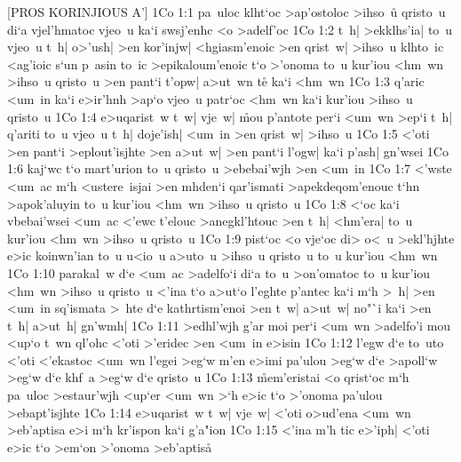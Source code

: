 [PROS KORINJIOUS A']
\vs 1Co 1:1
pa~uloc
klht`oc
>ap'ostoloc
>ihso~u\r{}
qristo~u
di`a
vjel'hmatoc
vjeo~u
ka`i
swsj'enhc
<o
>adelf'oc\bibvsend
\vs 1Co 1:2
t~h|
>ekklhs'ia|
to~u
vjeo~u
t~h|
o>'ush|
>en
kor'injw|
<hgiasm'enoic
>en
qrist~w|
>ihso~u
klhto~ic
<ag'ioic
s`un
p~asin
to~ic
>epikaloum'enoic
t`o
>'onoma
to~u
kur'iou
<hm~wn
>ihso~u
qristo~u
>en
pant`i
t'opw|
a>ut~wn
t\r{e}
ka`i
<hm~wn\bibvsend
\vs 1Co 1:3
q'aric
<um~in
ka`i
e>ir'hnh
>ap`o
vjeo~u
patr`oc
<hm~wn
ka`i
kur'iou
>ihso~u
qristo~u\bibvsend
\vs 1Co 1:4
e>uqarist~w
t~w|
vje~w|
\r{m}ou
p'antote
per`i
<um~wn
>ep`i
t~h|
q'ariti
to~u
vjeo~u
t~h|
doje'ish|
<um~in
>en
qrist~w|
>ihso~u\bibvsend
\vs 1Co 1:5
<'oti
>en
pant`i
>eplout'isjhte
>en
a>ut~w|
>en
pant`i
l'ogw|
ka`i
p'ash|
gn'wsei\bibvsend
\vs 1Co 1:6
kaj`wc
t`o
mart'urion
to~u
qristo~u
>ebebai'wjh
>en
<um~in\bibvsend
\vs 1Co 1:7
<'wste
<um~ac
m`h
<ustere~isjai
>en
mhden`i
qar'ismati
>apekdeqom'enouc
t`hn
>apok'aluyin
to~u
kur'iou
<hm~wn
>ihso~u
qristo~u\bibvsend
\vs 1Co 1:8
<`oc
ka`i
vbebai'wsei
<um~ac
<'ewc
t'elouc
>anegkl'htouc
>en
t~h|
<hm'era|
to~u
kur'iou
<hm~wn
>ihso~u
qristo~u\bibvsend
\vs 1Co 1:9
pist`oc
<o
vje`oc
di>
o<~u
>ekl'hjhte
e>ic
koinwn'ian
to~u
u<io~u
a>uto~u
>ihso~u
qristo~u
to~u
kur'iou
<hm~wn\bibvsend
\vs 1Co 1:10
parakal~w
d`e
<um~ac
>adelfo`i
di`a
to~u
>on'omatoc
to~u
kur'iou
<hm~wn
>ihso~u
qristo~u
<'ina
t`o
a>ut`o
l'eghte
p'antec
ka`i
m`h
>~h|
>en
<um~in
sq'ismata
>~hte
d`e
kathrtism'enoi
>en
t~w|
a>ut~w|
no"`i
ka`i
>en
t~h|
a>ut~h|
gn'wmh|\bibvsend
\vs 1Co 1:11
>edhl'wjh
g'ar
moi
per`i
<um~wn
>adelfo'i
mou
<up`o
t~wn
ql'ohc
<'oti
>'eridec
>en
<um~in
e>isin\bibvsend
\vs 1Co 1:12
l'egw
d`e
to~uto
<'oti
<'ekastoc
<um~wn
l'egei
>eg`w
m'en
e>imi
pa'ulou
>eg`w
d`e
>apoll`w
>eg`w
d`e
khf~a
>eg`w
d`e
qristo~u\bibvsend
\vs 1Co 1:13
\r{m}em'eristai
<o
qrist`oc
m`h
pa~uloc
>estaur'wjh
<up`er
<um~wn
>`h
e>ic
t`o
>'onoma
pa'ulou
>ebapt'isjhte\bibvsend
\vs 1Co 1:14
e>uqarist~w
t~w|
vje~w|
<'oti
o>ud'ena
<um~wn
>eb'aptisa
e>i
m`h
kr'ispon
ka`i
g'a"ion\bibvsend
\vs 1Co 1:15
<'ina
m'h
tic
e>'iph|
<'oti
e>ic
t`o
>em`on
>'onoma
>eb'aptis\r{a}\bibvsend
{}
